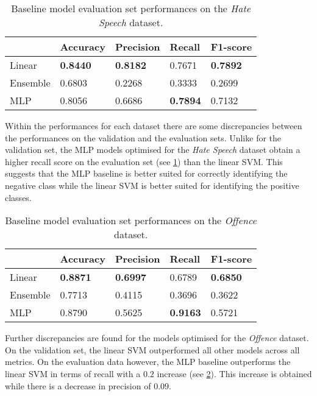 \begin{table}[h]
  \centering
  \begin{tabular}{l|llll}
             & Accuracy        & Precision       & Recall          & F1-score        \\\hline
    Linear   & \textbf{0.8440} & \textbf{0.8182} & 0.7671          & \textbf{0.7892} \\
    Ensemble & 0.6803          & 0.2268          & 0.3333          & 0.2699          \\
    MLP      & 0.8056          & 0.6686          & \textbf{0.7894} & 0.7132
  \end{tabular}
  \caption{Baseline model evaluation set performances on the \textit{Hate Speech} dataset.}
  \label{tab:baseline_test_wh}
\end{table}

Within the performances for each dataset there are some discrepancies between the performances on the validation and the evaluation sets.
Unlike for the validation set, the MLP models optimised for the \textit{Hate Speech} dataset obtain a higher recall score on the evaluation set (see \cref{tab:baseline_test_wh}) than the linear SVM.
This suggests that the MLP baseline is better suited for correctly identifying the negative class while the linear SVM is better suited for identifying the positive classes.

\begin{table}[h]
  \centering
  \begin{tabular}{l|llll}
             & Accuracy        & Precision       & Recall          & F1-score        \\\hline
    Linear   & \textbf{0.8871} & \textbf{0.6997} & 0.6789          & \textbf{0.6850} \\
    Ensemble & 0.7713          & 0.4115          & 0.3696          & 0.3622          \\
    MLP      & 0.8790          & 0.5625          & \textbf{0.9163} & 0.5721
  \end{tabular}
  \caption{Baseline model evaluation set performances on the \textit{Offence} dataset.}
  \label{tab:baseline_test_davidson}
\end{table}

Further discrepancies are found for the models optimised for the \textit{Offence} dataset.
On the validation set, the linear SVM outperformed all other models across all metrics.
On the evaluation data however, the MLP baseline outperforms the linear SVM in terms of recall with a $0.2$ increase (see \cref{tab:baseline_test_davidson}).
This increase is obtained while there is a decrease in precision of $0.09$.


